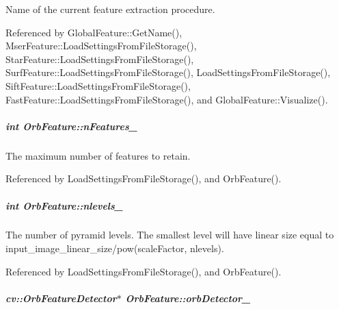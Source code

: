 Name of the current feature extraction procedure. 



Referenced by Global\-Feature\-::\-Get\-Name(), Mser\-Feature\-::\-Load\-Settings\-From\-File\-Storage(), Star\-Feature\-::\-Load\-Settings\-From\-File\-Storage(), Surf\-Feature\-::\-Load\-Settings\-From\-File\-Storage(), Load\-Settings\-From\-File\-Storage(), Sift\-Feature\-::\-Load\-Settings\-From\-File\-Storage(), Fast\-Feature\-::\-Load\-Settings\-From\-File\-Storage(), and Global\-Feature\-::\-Visualize().

\hypertarget{group___feature_extractor_a8fb8ef05ff3dff5ffee90c6f41e83cb2}{
\subparagraph[{n\-Features\-\_\-}]{\setlength{\rightskip}{0pt plus 5cm}int Orb\-Feature\-::n\-Features\-\_\-\hspace{0.3cm}{\ttfamily [private]}}}\label{group___feature_extractor_a8fb8ef05ff3dff5ffee90c6f41e83cb2}


The maximum number of features to retain. 



Referenced by Load\-Settings\-From\-File\-Storage(), and Orb\-Feature().

\hypertarget{group___feature_extractor_abfb07330bd1a63270f935e1317111300}{
\subparagraph[{nlevels\-\_\-}]{\setlength{\rightskip}{0pt plus 5cm}int Orb\-Feature\-::nlevels\-\_\-\hspace{0.3cm}{\ttfamily [private]}}}\label{group___feature_extractor_abfb07330bd1a63270f935e1317111300}


The number of pyramid levels. The smallest level will have linear size equal to input\-\_\-image\-\_\-linear\-\_\-size/pow(scale\-Factor, nlevels). 



Referenced by Load\-Settings\-From\-File\-Storage(), and Orb\-Feature().

\hypertarget{group___feature_extractor_afbddce112b372099591a6ec049aff0f5}{
\subparagraph[{orb\-Detector\-\_\-}]{\setlength{\rightskip}{0pt plus 5cm}cv\-::\-Orb\-Feature\-Detector$\ast$ Orb\-Feature\-::orb\-Detector\-\_\-\hspace{0.3cm}{\ttfamily [private]}}}\label{group___feature_extractor_afbddce112b372099591a6ec049aff0f5}


